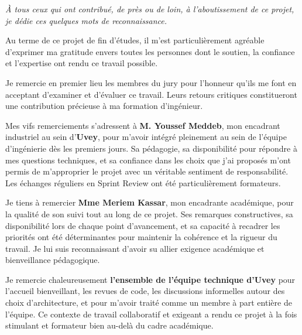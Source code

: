 
\textit{À tous ceux qui ont contribué, de près ou de loin, à l'aboutissement de ce projet, je dédie ces quelques mots de reconnaissance.}

\vspace{0.8cm}

Au terme de ce projet de fin d'études, il m'est particulièrement agréable d'exprimer ma gratitude envers toutes les personnes dont le soutien, la confiance et l'expertise ont rendu ce travail possible.

\vspace{0.5cm}

Je remercie en premier lieu les membres du jury pour l'honneur qu'ils me font en acceptant d'examiner et d'évaluer ce travail. Leurs retours critiques constitueront une contribution précieuse à ma formation d'ingénieur.

\vspace{0.5cm}

Mes vifs remerciements s'adressent à \textbf{M. Youssef Meddeb}, mon encadrant industriel au sein d'\textbf{Uvey}, pour m'avoir intégré pleinement au sein de l'équipe d'ingénierie dès les premiers jours. Sa pédagogie, sa disponibilité pour répondre à mes questions techniques, et sa confiance dans les choix que j'ai proposés m'ont permis de m'approprier le projet avec un véritable sentiment de responsabilité. Les échanges réguliers en Sprint Review ont été particulièrement formateurs.

\vspace{0.5cm}

Je tiens à remercier \textbf{Mme Meriem Kassar}, mon encadrante académique, pour la qualité de son suivi tout au long de ce projet. Ses remarques constructives, sa disponibilité lors de chaque point d'avancement, et sa capacité à recadrer les priorités ont été déterminantes pour maintenir la cohérence et la rigueur du travail. Je lui suis reconnaissant d'avoir su allier exigence académique et bienveillance pédagogique.

\vspace{0.5cm}

Je remercie chaleureusement \textbf{l'ensemble de l'équipe technique d'Uvey} pour l'accueil bienveillant, les revues de code, les discussions informelles autour des choix d'architecture, et pour m'avoir traité comme un membre à part entière de l'équipe. Ce contexte de travail collaboratif et exigeant a rendu ce projet à la fois stimulant et formateur bien au-delà du cadre académique.

\vspace{0.5cm}



